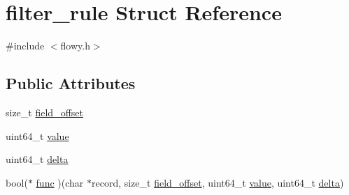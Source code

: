 \hypertarget{structfilter__rule}{\section{filter\-\_\-rule \-Struct \-Reference}
\label{structfilter__rule}
}


{\ttfamily \#include $<$flowy.\-h$>$}

\subsection*{\-Public \-Attributes}
\begin{DoxyCompactItemize}
\item 
size\-\_\-t \hyperlink{structfilter__rule_ae808db59ea5ef6037127ab92eec860bc}{field\-\_\-offset}
\item 
uint64\-\_\-t \hyperlink{structfilter__rule_a58fec5582954b48c67bd0b91113581cc}{value}
\item 
uint64\-\_\-t \hyperlink{structfilter__rule_aa60920ee7afd35534481a141508e9a76}{delta}
\item 
bool($\ast$ \hyperlink{structfilter__rule_a3ce3f038c9e169a6940e6aff45759b34}{func} )(char $\ast$record, size\-\_\-t \hyperlink{structfilter__rule_ae808db59ea5ef6037127ab92eec860bc}{field\-\_\-offset}, uint64\-\_\-t \hyperlink{structfilter__rule_a58fec5582954b48c67bd0b91113581cc}{value}, uint64\-\_\-t \hyperlink{structfilter__rule_aa60920ee7afd35534481a141508e9a76}{delta})
\end{DoxyCompactItemize}


